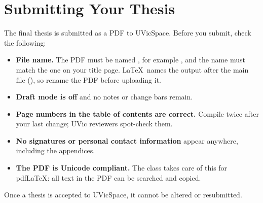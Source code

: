 \section{Submitting Your Thesis}
\label{sec:submitting}

The final thesis is submitted as a PDF to UVicSpace. Before you submit, check the following:
\begin{itemize}
    \item \textbf{File name.} The PDF must be named , for example , and the name must match the one on your title page. \LaTeX\ names the output after the main file (), so rename the PDF before uploading it.
    \item \textbf{Draft mode is off} and no  notes or change bars remain.
    \item \textbf{Page numbers in the table of contents are correct.} Compile twice after your last change; UVic reviewers spot-check them.
    \item \textbf{No signatures or personal contact information} appear anywhere, including the appendices.
    \item \textbf{The PDF is Unicode compliant.} The class takes care of this for pdf\LaTeX: all text in the PDF can be searched and copied.
\end{itemize}
Once a thesis is accepted to UVicSpace, it cannot be altered or resubmitted.
